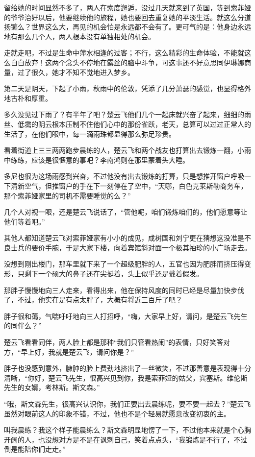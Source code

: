 留给她的时间显然不多了，两人在索度邂逅，没过几天就来到了英国，等到索菲娅的爷爷治好以后，他要继续他的旅程，她也要回去重复她的平淡生活。就这么分道扬镳么？世界这么大，再见的机会怕是永远都不会有了。更可气的是：他身边永远地有那么几个人，两人根本没有单独相处的机会。

走就走吧，不过是生命中萍水相逢的过客；不行，这么精彩的生命体验，不能就这么白白放弃！这两个念头不停地在露丝的脑中斗争，可这事还不好意思同伊琳娜商量，过了很久，她才不知不觉地进入梦乡。

第二天是阴天，下起了小雨，秋雨中的伦敦，凭添了几分萧瑟的感觉，也显得格外地古朴和厚重。

多久没见过下雨了？有半年了吧？楚云飞他们几个一起床就兴奋了起来，细细的雨丝、低霭的阴云根本压制不住他们心中的那份雀跃，老天，总算可以过过正常人的生活了，在他们眼中，每一滴雨珠都显得那么弥足珍贵。

看着街道上三三两两跑步晨练的人，楚云飞和两个战友也打算出去锻炼一翻，小雨中练练，应该是很惬意的事吧？李南鸿则在那里蒙着头大睡。

多尼也很为这场雨感到兴奋，不过他没有出去锻炼的打算，只是想推开窗户呼吸一下清新空气，但推窗户的手在下一刻停在了空中，“天哪，白色克莱斯勒商务车，那个索菲娅家里的司机不需要睡觉的么？”

几个人对视一眼，还是楚云飞说话了，“管他呢，咱们锻炼咱们的，他们愿意等让他们等着吧。”

其他人都知道楚云飞对索菲娅家有小小的成见，成树国和刘宁更在猜想这没准是不良士兵的要价手腕，于是大家下楼，向着宾馆斜对面一个极其袖珍的小广场走去。

没想到刚出楼门，那车里就下来了一个超级肥胖的人，五官也因为肥胖而挤压得变形，只剩下一个硕大的鼻子还在尖挺着，头上似乎还是戴着假发。

那胖子慢慢地向三人走来，看得出来，他在保持风度的同时已经是尽量加快步伐了，不过，他实在是有点太胖了，大概有将近三百斤了吧？

胖子很和蔼，气喘吁吁地向三人打招呼，“嗨，大家早上好，请问，是楚云飞先生的同伴么？”

楚云飞看看同伴，两人脸上都是那种“我们只管看热闹”的表情，只好笑答对方，“早上好，我就是楚云飞，请问你是？”

胖子也没感到意外，臃肿的脸上费劲地挤出了一丝微笑，不过那善意是表现得十分清晰，“你好，楚云飞先生，很高兴见到你，我是索菲娅的姑父，宾塞斯。维伦斯先生的女婿，考林斯。斯文森。”

“哦，斯文森先生，很高兴认识你，我们正要出去晨练呢，要不要一起去？”楚云飞虽然对眼前这人的印象不错，不过，他也不是个轻易就愿意改变初衷的主。

叫我晨练？我这个样子能晨练么？斯文森明显地愣了一下，不过他本来就是个心胸开阔的人，也没想对方是不是在讽刺自己，笑着点点头，“我锻炼是不行了，不过倒是能陪你们走走。”

